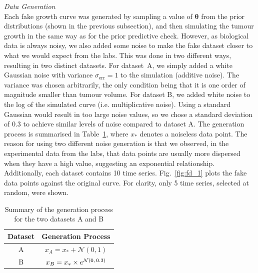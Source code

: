 \documentclass[11pt]{article}
\begin{document}
\textit{Data Generation}\\[5pt]
Each fake growth curve was generated by sampling a value of $\boldsymbol{\theta}$ from the prior distributions (shown in the previous subsection), and then simulating the tumour growth in the same way as for the prior predictive check. However, as biological data is always noisy, we also added some noise to make the fake dataset closer to what we would expect from the labs. This was done in two different ways, resulting in two distinct datasets. For dataset~A, we simply added a white Gaussian noise with variance $\sigma_\text{err}=1$ to the simulation (additive noise). The variance was chosen arbitrarily, the only condition being that it is one order of magnitude smaller than tumour volume. For dataset B, we added white noise to the log of the simulated curve (i.e. multiplicative noise). Using a standard Gaussian would result in too large noise values, so we chose a standard deviation of 0.3 to achieve similar levels of noise compared to dataset A. The generation process is summarised in Table~\ref{tbl:genproc}, where $x_*$ denotes a noiseless data point. The reason for using two different noise generation is that we observed, in the experimental data from the labs, that data points are usually more dispersed when they have a high value, suggesting an exponential relationship.\\ 
Additionally, each dataset contains 10 time series. Fig.~\ref{fig:fd_1} plots the fake data points against the original curve. For clarity, only 5 time series, selected at random, were shown.\\
\begin{table}[h!]
    \centering
    \caption{Summary of the generation process for the two datasets A and B}
    \begin{tabular}{c|c}
        \hline
        Dataset & Generation Process \\ \hline 
        A       & $x_A=x_*+\mathcal{N}(0,1)$ \\
        B       & $x_B=x_*\times e^{\mathcal{N}(0,\hspace{1.5px}0.3)}$ \\ \hline
    \end{tabular}
    \label{tbl:genproc}
\end{table}
\end{document}
